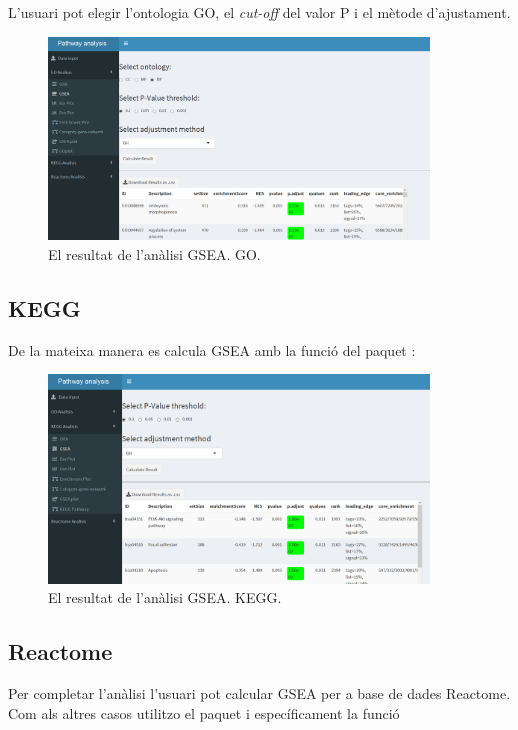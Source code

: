 L'usuari pot elegir l'ontologia GO, el \textit{cut-off} del valor P i el mètode d'ajustament.
\begin{figure}[H]
\centering
\includegraphics[width=0.9\textwidth]{figures/App_F11_Items_GO_GSEA.png} 
\caption{El resultat de l'anàlisi GSEA. GO.}
\end{figure}


\subsection{KEGG}
De la mateixa manera es calcula GSEA amb la funció  del paquet :

\begin{figure}[H]
\centering
\includegraphics[width=0.9\textwidth]{figures/App_F12_Items_KEGG_GSEA.png} 
\caption{El resultat de l'anàlisi GSEA. KEGG.}
\end{figure}

\subsection{Reactome}
Per completar l'anàlisi l'usuari pot calcular GSEA per a base de dades Reactome. Com als altres casos utilitzo el paquet  i específicament la funció 

